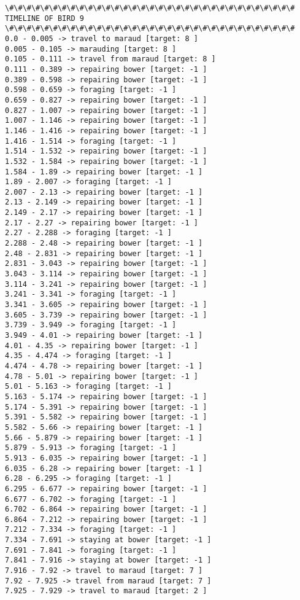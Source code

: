 \documentclass[11pt]{article}
\begin{document}
\begin{Verbatim}[commandchars=\\\{\}]
\#\#\#\#\#\#\#\#\#\#\#\#\#\#\#\#\#\#\#\#\#\#\#\#\#\#\#\#\#\#\#\#\#
TIMELINE OF BIRD 9
\#\#\#\#\#\#\#\#\#\#\#\#\#\#\#\#\#\#\#\#\#\#\#\#\#\#\#\#\#\#\#\#\#
0.0 - 0.005 -> travel to maraud [target: 8 ]
0.005 - 0.105 -> marauding [target: 8 ]
0.105 - 0.111 -> travel from maraud [target: 8 ]
0.111 - 0.389 -> repairing bower [target: -1 ]
0.389 - 0.598 -> repairing bower [target: -1 ]
0.598 - 0.659 -> foraging [target: -1 ]
0.659 - 0.827 -> repairing bower [target: -1 ]
0.827 - 1.007 -> repairing bower [target: -1 ]
1.007 - 1.146 -> repairing bower [target: -1 ]
1.146 - 1.416 -> repairing bower [target: -1 ]
1.416 - 1.514 -> foraging [target: -1 ]
1.514 - 1.532 -> repairing bower [target: -1 ]
1.532 - 1.584 -> repairing bower [target: -1 ]
1.584 - 1.89 -> repairing bower [target: -1 ]
1.89 - 2.007 -> foraging [target: -1 ]
2.007 - 2.13 -> repairing bower [target: -1 ]
2.13 - 2.149 -> repairing bower [target: -1 ]
2.149 - 2.17 -> repairing bower [target: -1 ]
2.17 - 2.27 -> repairing bower [target: -1 ]
2.27 - 2.288 -> foraging [target: -1 ]
2.288 - 2.48 -> repairing bower [target: -1 ]
2.48 - 2.831 -> repairing bower [target: -1 ]
2.831 - 3.043 -> repairing bower [target: -1 ]
3.043 - 3.114 -> repairing bower [target: -1 ]
3.114 - 3.241 -> repairing bower [target: -1 ]
3.241 - 3.341 -> foraging [target: -1 ]
3.341 - 3.605 -> repairing bower [target: -1 ]
3.605 - 3.739 -> repairing bower [target: -1 ]
3.739 - 3.949 -> foraging [target: -1 ]
3.949 - 4.01 -> repairing bower [target: -1 ]
4.01 - 4.35 -> repairing bower [target: -1 ]
4.35 - 4.474 -> foraging [target: -1 ]
4.474 - 4.78 -> repairing bower [target: -1 ]
4.78 - 5.01 -> repairing bower [target: -1 ]
5.01 - 5.163 -> foraging [target: -1 ]
5.163 - 5.174 -> repairing bower [target: -1 ]
5.174 - 5.391 -> repairing bower [target: -1 ]
5.391 - 5.582 -> repairing bower [target: -1 ]
5.582 - 5.66 -> repairing bower [target: -1 ]
5.66 - 5.879 -> repairing bower [target: -1 ]
5.879 - 5.913 -> foraging [target: -1 ]
5.913 - 6.035 -> repairing bower [target: -1 ]
6.035 - 6.28 -> repairing bower [target: -1 ]
6.28 - 6.295 -> foraging [target: -1 ]
6.295 - 6.677 -> repairing bower [target: -1 ]
6.677 - 6.702 -> foraging [target: -1 ]
6.702 - 6.864 -> repairing bower [target: -1 ]
6.864 - 7.212 -> repairing bower [target: -1 ]
7.212 - 7.334 -> foraging [target: -1 ]
7.334 - 7.691 -> staying at bower [target: -1 ]
7.691 - 7.841 -> foraging [target: -1 ]
7.841 - 7.916 -> staying at bower [target: -1 ]
7.916 - 7.92 -> travel to maraud [target: 7 ]
7.92 - 7.925 -> travel from maraud [target: 7 ]
7.925 - 7.929 -> travel to maraud [target: 2 ]

\end{Verbatim}
\end{document}
